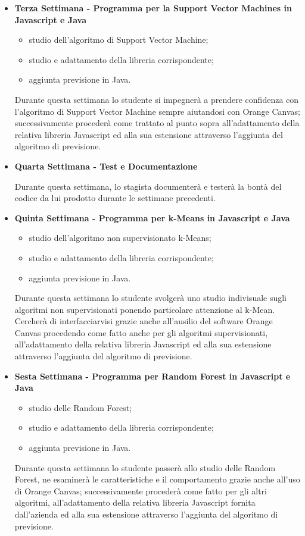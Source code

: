 \begin{itemize}
\item \textbf{Terza Settimana - Programma per la Support Vector Machines in Javascript e Java}
	\begin{itemize}
	\item studio dell'algoritmo di Support Vector Machine;
	\item studio e adattamento della libreria corrispondente;
	\item aggiunta previsione in Java.
	\end{itemize}
	Durante questa settimana lo studente si impegnerà a prendere confidenza con l'algoritmo di Support Vector Machine sempre aiutandosi con Orange Canvas; successivamente procederà come trattato al punto sopra all'adattamento della relativa libreria Javascript ed alla sua estensione attraverso l'aggiunta del algoritmo di previsione.


\item \textbf{Quarta Settimana - Test e Documentazione}
	\par Durante questa settimana, lo stagista documenterà e testerà la bontà del codice da lui prodotto durante le settimane precedenti.


\item \textbf{Quinta Settimana - Programma per k-Means in Javascript e Java}
\begin{itemize}
	\item studio dell'algoritmo non supervisionato k-Means;
	\item studio e adattamento della libreria corrispondente;
	\item aggiunta previsione in Java.
	\end{itemize}
	Durante questa settimana lo studente svolgerà uno studio indivisuale sugli algoritmi non supervisionati ponendo particolare attenzione al k-Mean. Cercherà di interfacciarvisi grazie anche all'ausilio del software Orange Canvas procedendo come fatto anche per gli algoritmi supervisionati, all'adattamento della relativa libreria Javascript ed alla sua estensione attraverso l'aggiunta del algoritmo di previsione.
	
	
\item \textbf{Sesta Settimana - Programma per Random Forest in Javascript e Java}
\begin{itemize}
	\item studio delle Random Forest;
	\item studio e adattamento della libreria corrispondente;
	\item aggiunta previsione in Java.
	\end{itemize}
	Durante questa settimana lo studente passerà allo studio delle Random Forest, ne esaminerà le caratteristiche e il comportamento grazie anche all'uso di Orange Canvas; successivamente procederà come fatto per gli altri algoritmi, all'adattamento della relativa libreria Javascript fornita dall'azienda ed alla sua estensione attraverso l'aggiunta del algoritmo di previsione.
	

\end{itemize}

